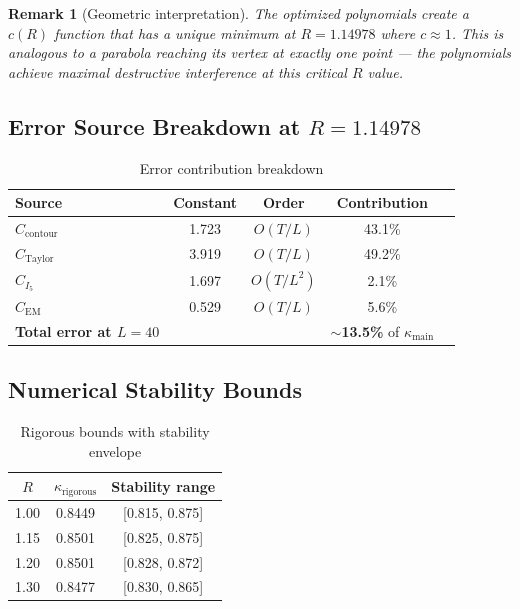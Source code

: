 \documentclass[11pt]{article}
\newtheorem{remark}{Remark}
\begin{document}
\begin{remark}[Geometric interpretation]
The optimized polynomials create a $c(R)$ function that has a unique minimum at $R = 1.14978$ where $c \approx 1$. This is analogous to a parabola reaching its vertex at exactly one point --- the polynomials achieve maximal destructive interference at this critical $R$ value.
\end{remark}

\subsection{Error Source Breakdown at $R = 1.14978$}

\begin{table}[h]
\centering
\caption{Error contribution breakdown}
\begin{tabular}{lcccc}
\toprule
Source & Constant & Order & Contribution \\
\midrule
$C_{\text{contour}}$ & 1.723 & $O(T/L)$ & 43.1\% \\
$C_{\text{Taylor}}$ & 3.919 & $O(T/L)$ & 49.2\% \\
$C_{I_5}$ & 1.697 & $O(T/L^2)$ & 2.1\% \\
$C_{\text{EM}}$ & 0.529 & $O(T/L)$ & 5.6\% \\
\midrule
\textbf{Total error at $L=40$} & & & \textbf{$\sim$13.5\%} of $\kappa_{\text{main}}$ \\
\bottomrule
\end{tabular}
\end{table}

\subsection{Numerical Stability Bounds}

\begin{table}[h]
\centering
\caption{Rigorous bounds with stability envelope}
\begin{tabular}{ccc}
\toprule
$R$ & $\kappa_{\text{rigorous}}$ & Stability range \\
\midrule
1.00 & 0.8449 & [0.815, 0.875] \\
1.15 & 0.8501 & [0.825, 0.875] \\
1.20 & 0.8501 & [0.828, 0.872] \\
1.30 & 0.8477 & [0.830, 0.865] \\
\bottomrule
\end{tabular}
\end{table}
\end{document}
